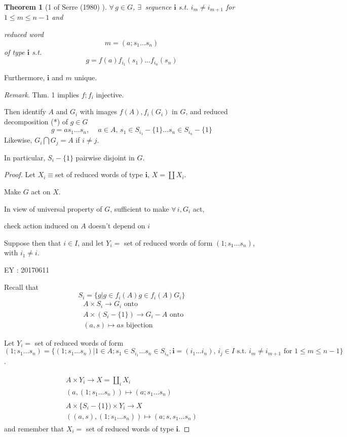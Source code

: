 \documentclass[10pt]{amsart}
\newtheorem{theorem}{Theorem}
\begin{document}
\begin{multicols*}{2}
\begin{theorem}[1 of Serre (1980) \cite{Serr1980} ]
	$\forall \, g \in G$, $\exists \, $ sequence $\mathbf{i}$ s.t. $i_m \neq i_{m+1}$ for $1\leq m \leq n-1$ and 
	
	reduced word 
	\[
	m = (a;s_1\dots s_n) 
	\]
	of type $\mathbf{i}$ s.t. 
	\[
	g = f(a)f_{i_1}(s_1) \dots f_{i_n}(s_n)
	\]
\end{theorem}

Furthermore, $\mathbf{i}$ and $m$ unique.  

\emph{Remark}.  Thm. 1 implies $f;f_i$ injective.  

Then identify $A$ and $G_i$ with images $f(A), f_i(G_i)$ in $G$, and reduced decomposition (*) of $g\in G$ 
\[
g = as_1\dots s_n, \quad \, a\in A, \, s_1 \in S_{i_1} - \lbrace 1 \rbrace \dots s_n \in S_{i_n} - \lbrace 1 \rbrace
\]
Likewise, $G_i \bigcap G_j = A$ if $i\neq j$.  

In particular, $S_i - \lbrace 1 \rbrace$ pairwise disjoint in $G$.  

\begin{proof}
Let $X_i \equiv $set of reduced words of type $\mathbf{i}$, $X = \coprod X_i$.  

Make $G$ act on $X$.  

In view of universal property of $G$, sufficient to make $\forall \, i, G_i$ act, 

check action induced on $A$ doesn't depend on $i$  

Suppose then that $i\in I$, and let $Y_i = $ set of reduced words of form $(1;s_1 \dots s_n)$, with $i_1\neq i$.  

EY : 20170611

Recall that 
\[
S_i = \lbrace g| g\in f_i(A) g \in f_i(A) G_i \rbrace
\]
\[
\begin{aligned}
	& A \times S_i \to G_i \text{ onto } \\ 
	& A\times (S_i - \lbrace 1 \rbrace) \to G_i - A \text{ onto } \\ 
	& (a,s) \mapsto as \text{ bijection }
\end{aligned}
\]

Let $Y_i = $ set of reduced words of form $(1; s_1 \dots s_n) = \lbrace (1;s_1 \dots s_n) | 1\in A; s_1 \in S_{i_1}\dots s_n \in S_{i_n} ; \mathbf{i} = (i_1\dots i_n), \, i_j \in I \text{ s.t. } i_m \neq i_{m+1} \text{ for } 1\leq m \leq n -1 \rbrace$.  

\[
\begin{gathered}
\begin{gathered}
A \times Y_i \to X = \coprod_i X_i \\
(a,(1; s_1 \dots s_n)) \mapsto (a; s_1 \dots s_n)
\end{gathered} \\
\begin{gathered}
A\times \lbrace S_i - \lbrace 1 \rbrace ) \times Y_i \to X \\
((a,s), (1;s_1 \dots s_n)) \mapsto (a;s,s_1\dots s_n)
\end{gathered}
\end{gathered}
\]
and remember that $X_i = $ set of reduced words of type $\mathbf{i}$.  


\end{proof}
\end{multicols*}
\end{document}
